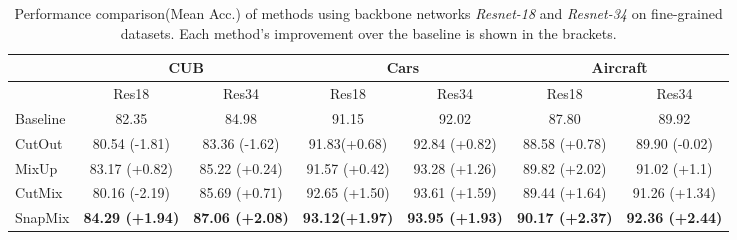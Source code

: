 \documentclass[letterpaper]{article} \usepackage{aaai21}  \usepackage{times}  \usepackage{helvet} \usepackage{courier}  \usepackage[hyphens]{url}  \usepackage{graphicx} \urlstyle{rm} \def\UrlFont{\rm}  \usepackage{natbib}  \usepackage{caption} \frenchspacing  \setlength{\pdfpagewidth}{8.5in}  \setlength{\pdfpageheight}{11in}
\begin{document}
\iffalse



\fi

  \begin{table*}
\caption{Performance comparison(Mean Acc.) of methods using backbone networks \textit{Resnet-18} and \textit{Resnet-34} on fine-grained datasets. Each method's improvement over the baseline is shown in the brackets.  }
        \begin{center}
            \begin{tabular}{lcc|cc|cc}
\toprule
& \multicolumn{2}{c}{CUB} & \multicolumn{2}{c}{Cars} & \multicolumn{2}{c}{Aircraft} \\
            \midrule
&Res18 & Res34  &Res18 & Res34 &Res18 & Res34  \\
            Baseline & 82.35 & 84.98 &91.15  & 92.02 & 87.80 & 89.92  \\
            \hline
            CutOut & 80.54 (-1.81) & 83.36 (-1.62)  & 91.83(+0.68) & 92.84 (+0.82) & 88.58 (+0.78) & 89.90 (-0.02) \\
             MixUp              & 83.17 (+0.82)  & 85.22 (+0.24) & 91.57 (+0.42) & 93.28 (+1.26) & 89.82 (+2.02) & 91.02 (+1.1) \\


CutMix            & 80.16 (-2.19)& 85.69 (+0.71) &  92.65 (+1.50) & 93.61 (+1.59)& 89.44 (+1.64) & 91.26 (+1.34) \\
             \hline
             SnapMix            & \textbf{84.29 (+1.94)}  & \textbf{87.06 (+2.08)} &\textbf{93.12(+1.97)} &  \textbf{93.95 (+1.93)} &\textbf{90.17 (+2.37)}  & \textbf{92.36 (+2.44)}\\
\bottomrule
            \end{tabular}
\end{center}
        \label{table:augmentation}
\end{table*}
  
\end{document}
